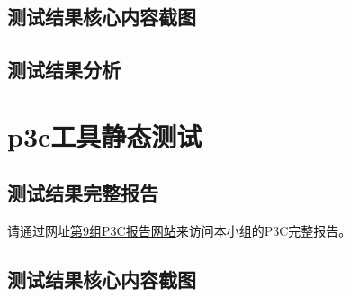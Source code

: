 \documentclass[hyperref, a4paper]{ctexart}
\begin{document}
\hypertarget{ux6d4bux8bd5ux7ed3ux679cux6838ux5fc3ux5185ux5bb9ux622aux56fe}{%
\subsection{测试结果核心内容截图}\label{ux6d4bux8bd5ux7ed3ux679cux6838ux5fc3ux5185ux5bb9ux622aux56fe}}

\hypertarget{ux6d4bux8bd5ux7ed3ux679cux5206ux6790}{%
\subsection{测试结果分析}\label{ux6d4bux8bd5ux7ed3ux679cux5206ux6790}}

\hypertarget{p3cux5de5ux5177ux9759ux6001ux6d4bux8bd5}{%
\section{p3c工具静态测试}\label{p3cux5de5ux5177ux9759ux6001ux6d4bux8bd5}}

\hypertarget{ux6d4bux8bd5ux7ed3ux679cux5b8cux6574ux62a5ux544a-1}{%
\subsection{测试结果完整报告}\label{ux6d4bux8bd5ux7ed3ux679cux5b8cux6574ux62a5ux544a-1}}

请通过网址\href{https://straybird-atsh.github.io/SoftwareQA-Testing/P3CReport.html}{第9组P3C报告网站}来访问本小组的P3C完整报告。

\hypertarget{ux6d4bux8bd5ux7ed3ux679cux6838ux5fc3ux5185ux5bb9ux622aux56fe-1}{%
\subsection{测试结果核心内容截图}\label{ux6d4bux8bd5ux7ed3ux679cux6838ux5fc3ux5185ux5bb9ux622aux56fe-1}}
\end{document}
